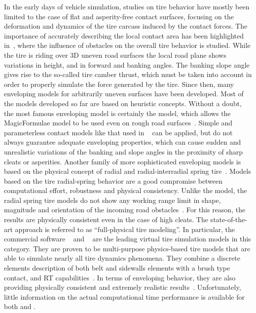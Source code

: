 In the early days of vehicle simulation, studies on tire behavior have mostly been limited to the case of flat and asperity-free contact surfaces, focusing on the deformation and dynamics of the tire carcass induced by the contact forces. The importance of accurately describing the local contact area has been highlighted in~\cite{kageyama2002study, pacejka2005spin}, where the influence of obstacles on the overall tire behavior is studied. While the tire is riding over 3D uneven road surfaces the local road plane shows variations in height, and in forward and banking angles. The banking slope angle gives rise to the so-called tire camber thrust, which must be taken into account in order to properly simulate the force generated by the tire. Since then, many enveloping models for arbitrarily uneven surfaces have been developed. Most of the models developed so far are based on heuristic concepts. Without a doubt, the most famous enveloping model is certainly the \Swift{} model, which allows the MagicFormulae{} model to be used even on rough road surfaces~\cite{schmeitz2004semiempirical}. Simple and parameterless contact models like that used in \TMEasy{}~\cite{rill2013tmeasy, rill2018sophisticated} can be applied, but do not always guarantee adequate enveloping properties,  which can cause sudden and unrealistic variations of the banking and slope angles in the proximity of sharp cleats or asperities. Another family of more sophisticated enveloping models is based on the physical concept of radial and radial-interradial spring tire~\cite{davis1975radial, badalamenti1988radial, negrut1994dynamic}. Models based on the tire radial-spring behavior are a good compromise between computational effort, robustness and physical consistency. Unlike the \Swift{} model, the radial spring tire models do not show any working range limit in shape, magnitude and orientation of the incoming road obstacles~\cite{davis1975radial}. For this reason, the results are physically consistent even in the case of high cleats. The state-of-the-art approach is referred to as ``full-physical tire modeling''. In particular, the commercial software \FTire{}~\cite{gipser2005ftire} and \CDTire{}~\cite{gallrein2007cdtire, gallrein2014advanced} are the leading virtual tire simulation models in this category. They are proven to be multi-purpose physics-based tire models that are able to simulate nearly all tire dynamics phenomena. They combine a discrete elements description of both belt and sidewalls elements with a brush type contact, and \ac{RT} capabilities~\cite{gipser2021ftire}. In terms of enveloping behavior, they are also providing physically consistent and extremely realistic results~\cite{gipser2008ftire, gallrein2007cdtire}. Unfortunately, little information on the actual computational time performance is available for both \FTire{} and \CDTire{}.

